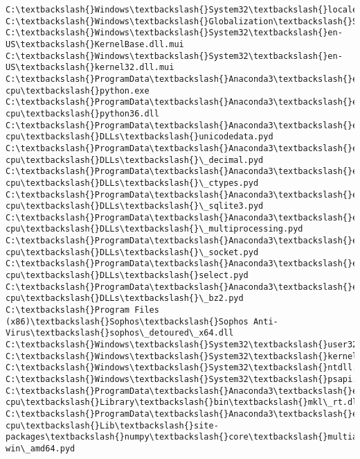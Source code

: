 \documentclass[11pt]{article}
\begin{document}
    \begin{Verbatim}[commandchars=\\\{\}]
C:\textbackslash{}Windows\textbackslash{}System32\textbackslash{}locale.nls
C:\textbackslash{}Windows\textbackslash{}Globalization\textbackslash{}Sorting\textbackslash{}SortDefault.nls
C:\textbackslash{}Windows\textbackslash{}System32\textbackslash{}en-US\textbackslash{}KernelBase.dll.mui
C:\textbackslash{}Windows\textbackslash{}System32\textbackslash{}en-US\textbackslash{}kernel32.dll.mui
C:\textbackslash{}ProgramData\textbackslash{}Anaconda3\textbackslash{}envs\textbackslash{}fastai-cpu\textbackslash{}python.exe
C:\textbackslash{}ProgramData\textbackslash{}Anaconda3\textbackslash{}envs\textbackslash{}fastai-cpu\textbackslash{}python36.dll
C:\textbackslash{}ProgramData\textbackslash{}Anaconda3\textbackslash{}envs\textbackslash{}fastai-cpu\textbackslash{}DLLs\textbackslash{}unicodedata.pyd
C:\textbackslash{}ProgramData\textbackslash{}Anaconda3\textbackslash{}envs\textbackslash{}fastai-cpu\textbackslash{}DLLs\textbackslash{}\_decimal.pyd
C:\textbackslash{}ProgramData\textbackslash{}Anaconda3\textbackslash{}envs\textbackslash{}fastai-cpu\textbackslash{}DLLs\textbackslash{}\_ctypes.pyd
C:\textbackslash{}ProgramData\textbackslash{}Anaconda3\textbackslash{}envs\textbackslash{}fastai-cpu\textbackslash{}DLLs\textbackslash{}\_sqlite3.pyd
C:\textbackslash{}ProgramData\textbackslash{}Anaconda3\textbackslash{}envs\textbackslash{}fastai-cpu\textbackslash{}DLLs\textbackslash{}\_multiprocessing.pyd
C:\textbackslash{}ProgramData\textbackslash{}Anaconda3\textbackslash{}envs\textbackslash{}fastai-cpu\textbackslash{}DLLs\textbackslash{}\_socket.pyd
C:\textbackslash{}ProgramData\textbackslash{}Anaconda3\textbackslash{}envs\textbackslash{}fastai-cpu\textbackslash{}DLLs\textbackslash{}select.pyd
C:\textbackslash{}ProgramData\textbackslash{}Anaconda3\textbackslash{}envs\textbackslash{}fastai-cpu\textbackslash{}DLLs\textbackslash{}\_bz2.pyd
C:\textbackslash{}Program Files (x86)\textbackslash{}Sophos\textbackslash{}Sophos Anti-Virus\textbackslash{}sophos\_detoured\_x64.dll
C:\textbackslash{}Windows\textbackslash{}System32\textbackslash{}user32.dll
C:\textbackslash{}Windows\textbackslash{}System32\textbackslash{}kernel32.dll
C:\textbackslash{}Windows\textbackslash{}System32\textbackslash{}ntdll.dll
C:\textbackslash{}Windows\textbackslash{}System32\textbackslash{}psapi.dll
C:\textbackslash{}ProgramData\textbackslash{}Anaconda3\textbackslash{}envs\textbackslash{}fastai-cpu\textbackslash{}Library\textbackslash{}bin\textbackslash{}mkl\_rt.dll
C:\textbackslash{}ProgramData\textbackslash{}Anaconda3\textbackslash{}envs\textbackslash{}fastai-cpu\textbackslash{}Lib\textbackslash{}site-packages\textbackslash{}numpy\textbackslash{}core\textbackslash{}multiarray.cp36-win\_amd64.pyd

\end{Verbatim}
\end{document}
